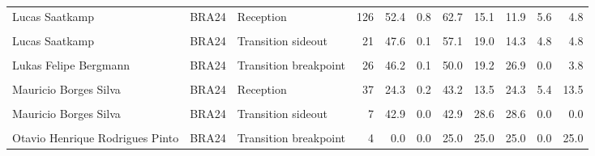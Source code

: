 \documentclass[
]{book}
\begin{document}
\begin{table}[!h]
{\begin{tabular}[t]{lllrrrrrrrr}
Lucas Saatkamp & BRA24 & Reception & 126 & 52.4 & 0.8 & 62.7 & 15.1 & 11.9 & 5.6 & 4.8\\
\cellcolor{gray!10}{Lucas Saatkamp} & \cellcolor{gray!10}{BRA24} & \cellcolor{gray!10}{Transition breakpoint} & \cellcolor{gray!10}{28} & \cellcolor{gray!10}{46.4} & \cellcolor{gray!10}{0.2} & \cellcolor{gray!10}{60.7} & \cellcolor{gray!10}{10.7} & \cellcolor{gray!10}{14.3} & \cellcolor{gray!10}{3.6} & \cellcolor{gray!10}{10.7}\\
Lucas Saatkamp & BRA24 & Transition sideout & 21 & 47.6 & 0.1 & 57.1 & 19.0 & 14.3 & 4.8 & 4.8\\
\cellcolor{gray!10}{Lukas Felipe Bergmann} & \cellcolor{gray!10}{BRA24} & \cellcolor{gray!10}{Reception} & \cellcolor{gray!10}{47} & \cellcolor{gray!10}{29.8} & \cellcolor{gray!10}{0.2} & \cellcolor{gray!10}{46.8} & \cellcolor{gray!10}{17.0} & \cellcolor{gray!10}{19.1} & \cellcolor{gray!10}{0.0} & \cellcolor{gray!10}{17.0}\\
\addlinespace
Lukas Felipe Bergmann & BRA24 & Transition breakpoint & 26 & 46.2 & 0.1 & 50.0 & 19.2 & 26.9 & 0.0 & 3.8\\
\cellcolor{gray!10}{Lukas Felipe Bergmann} & \cellcolor{gray!10}{BRA24} & \cellcolor{gray!10}{Transition sideout} & \cellcolor{gray!10}{11} & \cellcolor{gray!10}{72.7} & \cellcolor{gray!10}{0.1} & \cellcolor{gray!10}{72.7} & \cellcolor{gray!10}{9.1} & \cellcolor{gray!10}{18.2} & \cellcolor{gray!10}{0.0} & \cellcolor{gray!10}{0.0}\\
Mauricio Borges Silva & BRA24 & Reception & 37 & 24.3 & 0.2 & 43.2 & 13.5 & 24.3 & 5.4 & 13.5\\
\cellcolor{gray!10}{Mauricio Borges Silva} & \cellcolor{gray!10}{BRA24} & \cellcolor{gray!10}{Transition breakpoint} & \cellcolor{gray!10}{16} & \cellcolor{gray!10}{62.5} & \cellcolor{gray!10}{0.1} & \cellcolor{gray!10}{62.5} & \cellcolor{gray!10}{18.8} & \cellcolor{gray!10}{18.8} & \cellcolor{gray!10}{0.0} & \cellcolor{gray!10}{0.0}\\
Mauricio Borges Silva & BRA24 & Transition sideout & 7 & 42.9 & 0.0 & 42.9 & 28.6 & 28.6 & 0.0 & 0.0\\
\addlinespace
\cellcolor{gray!10}{Otavio Henrique Rodrigues Pinto} & \cellcolor{gray!10}{BRA24} & \cellcolor{gray!10}{Reception} & \cellcolor{gray!10}{4} & \cellcolor{gray!10}{50.0} & \cellcolor{gray!10}{0.0} & \cellcolor{gray!10}{75.0} & \cellcolor{gray!10}{0.0} & \cellcolor{gray!10}{0.0} & \cellcolor{gray!10}{0.0} & \cellcolor{gray!10}{25.0}\\
Otavio Henrique Rodrigues Pinto & BRA24 & Transition breakpoint & 4 & 0.0 & 0.0 & 25.0 & 25.0 & 25.0 & 0.0 & 25.0\\

\end{tabular}}
\end{table}
\end{document}
